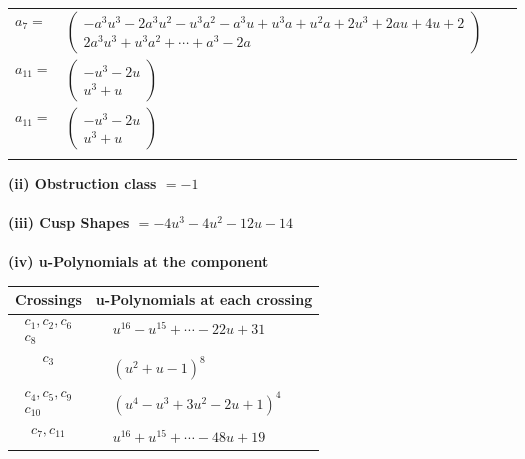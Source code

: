 \documentclass[1p]{elsarticle_modified}
\theoremstyle{definition}
\begin{document}
\begin{tabular}{m{7pt} m{180pt} m{7pt} m{180pt} }
\flushright $a_{7}=$&$\begin{pmatrix}- a^3 u^3-2 a^3 u^2- u^3 a^2- a^3 u+u^3 a+u^2 a+2 u^3+2 a u+4 u+2\\2 a^3 u^3+u^3 a^2+\cdots+a^3-2 a\end{pmatrix}$ \\
\flushright $a_{11}=$&$\begin{pmatrix}- u^3-2 u\\u^3+u\end{pmatrix}$\\ \flushright $a_{11}=$&$\begin{pmatrix}- u^3-2 u\\u^3+u\end{pmatrix}$\\&\end{tabular}
\flushleft \textbf{(ii) Obstruction class $= -1$}\\~\\
\flushleft \textbf{(iii) Cusp Shapes $= -4 u^3-4 u^2-12 u-14$}\\~\\
\newpage\renewcommand{\arraystretch}{1}
\flushleft \textbf{(iv) u-Polynomials at the component}\newline \\
\begin{tabular}{m{50pt}|m{274pt}}
Crossings & \hspace{64pt}u-Polynomials at each crossing \\
\hline $$\begin{aligned}c_{1},c_{2},c_{6}\\c_{8}\end{aligned}$$&$\begin{aligned}
&u^{16}- u^{15}+\cdots-22 u+31
\end{aligned}$\\
\hline $$\begin{aligned}c_{3}\end{aligned}$$&$\begin{aligned}
&(u^2+u-1)^8
\end{aligned}$\\
\hline $$\begin{aligned}c_{4},c_{5},c_{9}\\c_{10}\end{aligned}$$&$\begin{aligned}
&(u^4- u^3+3 u^2-2 u+1)^4
\end{aligned}$\\
\hline $$\begin{aligned}c_{7},c_{11}\end{aligned}$$&$\begin{aligned}
&u^{16}+u^{15}+\cdots-48 u+19
\end{aligned}$\\
\hline
\end{tabular}\\~\\
\end{document}
